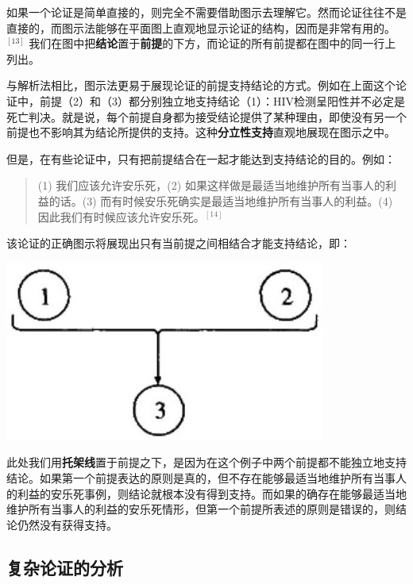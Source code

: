 如果一个论证是简单直接的，则完全不需要借助图示去理解它。然而论证往往不是直接的，而图示法能够在平面图上直观地显示论证的结构，因而是非常有用的。${}^{[13]}$ 我们在图中把\textbf{结论}置于\textbf{前提}的下方，而论证的所有前提都在图中的同一行上列出。

与解析法相比，图示法更易于展现论证的前提支持结论的方式。例如在上面这个论证中，前提（2）和（3）都分别独立地支持结论（1）：HIV检测呈阳性并不必定是死亡判决。就是说，每个前提自身都为接受结论提供了某种理由，即使没有另一个前提也不影响其为结论所提供的支持。这种\textbf{分立性支持}直观地展现在图示之中。

但是，在有些论证中，只有把前提结合在一起才能达到支持结论的目的。例如：

\begin{quotation}
(1) 我们应该允许安乐死，(2) 如果这样做是最适当地维护所有当事人的利益的话。(3) 而有时候安乐死确实是最适当地维护所有当事人的利益。(4) 因此我们有时候应该允许安乐死。${}^{[14]}$
\end{quotation}

该论证的正确图示将展现出只有当前提之间相结合才能支持结论，即：

\begin{center}
\includegraphics[width=\textwidth]{images/2025_05_15_6a28331d5e7c993ad07ag-031(1).jpg}
\end{center}

此处我们用\textbf{托架线}置于前提之下，是因为在这个例子中两个前提都不能独立地支持结论。如果第一个前提表达的原则是真的，但不存在能够最适当地维护所有当事人的利益的安乐死事例，则结论就根本没有得到支持。而如果的确存在能够最适当地维护所有当事人的利益的安乐死情形，但第一个前提所表述的原则是错误的，则结论仍然没有获得支持。

\subsection{复杂论证的分析}

